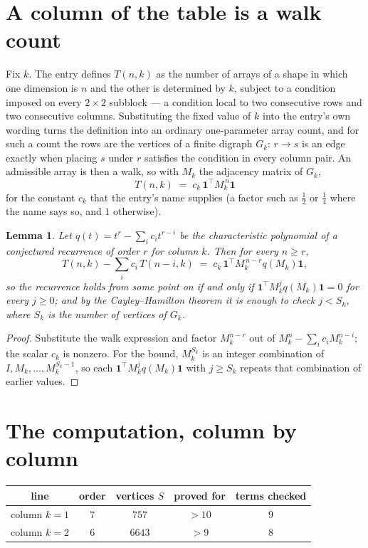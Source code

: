 \documentclass[11pt,a4paper]{article}
\theoremstyle{plain}
\newtheorem{lemma}[theorem]{Lemma}
\theoremstyle{definition}
\begin{document}
\section{A column of the table is a walk count}

Fix $k$. The entry defines $T(n,k)$ as the number of arrays of a shape in which one dimension
is $n$ and the other is determined by $k$, subject to a condition imposed on every
$2\times2$ subblock --- a condition local to two consecutive rows and two consecutive columns.
Substituting the fixed value of $k$ into the entry's own wording turns the definition into an
ordinary one-parameter array count, and for such a count the rows are the vertices of a finite
digraph $G_k$: $r\to s$ is an edge exactly when placing $s$ under $r$ satisfies the condition
in every column pair. An admissible array is then a walk, so with $M_k$ the adjacency matrix
of $G_k$,
\[
T(n,k)\;=\;c_k\,\mathbf{1}^{\!\top}M_k^{\,n}\mathbf{1}
\]
for the constant $c_k$ that the entry's name supplies (a factor such as $\tfrac12$ or
$\tfrac14$ where the name says so, and $1$ otherwise).

\begin{lemma}\label{lem:crit}
Let $q(t)=t^{r}-\sum_i c_it^{r-i}$ be the characteristic polynomial of a conjectured
recurrence of order $r$ for column $k$. Then for every $n\ge r$,
\[
T(n,k)-\sum_i c_i\,T(n-i,k)\;=\;c_k\,\mathbf{1}^{\!\top}M_k^{\,n-r}q(M_k)\mathbf{1},
\]
so the recurrence holds from some point on if and only if
$\mathbf{1}^{\!\top}M_k^{j}q(M_k)\mathbf{1}=0$ for every $j\ge0$; and by the
Cayley--Hamilton theorem it is enough to check $j<S_k$, where $S_k$ is the number of vertices
of $G_k$.
\end{lemma}

\begin{proof}
Substitute the walk expression and factor $M_k^{n-r}$ out of $M_k^{n}-\sum_ic_iM_k^{n-i}$;
the scalar $c_k$ is nonzero. For the bound, $M_k^{S_k}$ is an integer combination of
$I,M_k,\dots,M_k^{S_k-1}$, so each $\mathbf{1}^{\!\top}M_k^{j}q(M_k)\mathbf{1}$ with
$j\ge S_k$ repeats that combination of earlier values.
\end{proof}

\section{The computation, column by column}

\begin{center}
\begin{tabular}{ccccc}
line & order & vertices $S$ & proved for & terms checked \\ \hline
column $k$$=1$ & $7$ & $757$ & $>10$ & $9$ \\
column $k$$=2$ & $6$ & $6643$ & $>9$ & $8$ \\
\end{tabular}
\end{center}
\end{document}
